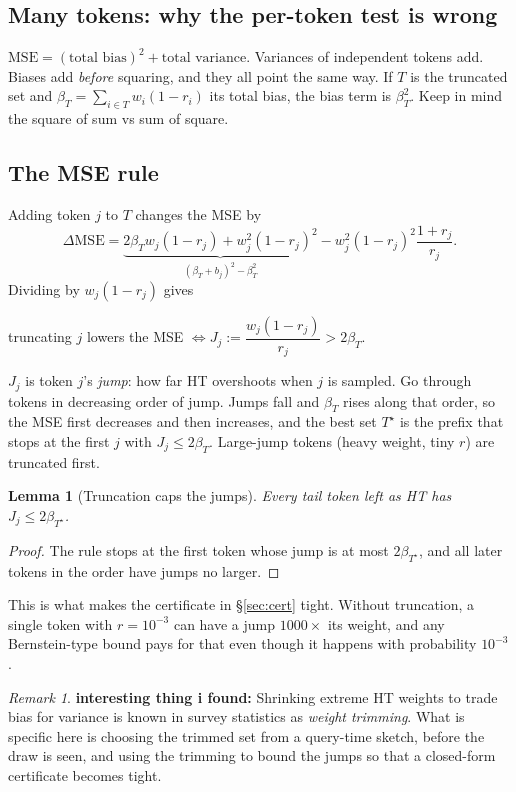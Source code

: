 \documentclass[11pt]{article}
\newtheorem{lemma}{Lemma}
\theoremstyle{definition}
\theoremstyle{remark}
\newtheorem{remark}{Remark}
\begin{document}
\subsection{Many tokens: why the per-token test is wrong}

$\mathrm{MSE} = (\text{total bias})^2 + \text{total variance}$. Variances of independent tokens add. Biases add
\emph{before} squaring, and they all point the same way. If $T$ is the truncated set and $\beta_T = \sum_{i \in T}
w_i(1 - r_i)$ its total bias, the bias term is $\beta_T^2$. Keep in mind the square of sum vs sum of square.

\subsection{The MSE rule}

Adding token $j$ to $T$ changes the MSE by
\[ \Delta\mathrm{MSE} = \underbrace{2\beta_T w_j(1 - r_j) + w_j^2(1 - r_j)^2}_{(\beta_T + b_j)^2 - \beta_T^2}
 - w_j^2 (1 - r_j)^2 \frac{1 + r_j}{r_j}. \]
Dividing by $w_j(1 - r_j)$ gives
\begin{tcolorbox}[colback=green!3,colframe=green!40!black,boxrule=0.4pt,arc=2pt]
\centering truncating $j$ lowers the MSE $\iff J_j := \dfrac{w_j(1 - r_j)}{r_j} > 2\beta_T$.
\end{tcolorbox}
$J_j$ is token $j$'s \emph{jump}: how far HT overshoots when $j$ is sampled. Go through tokens in decreasing order of jump.
Jumps fall and $\beta_T$ rises along that order, so the MSE first decreases and then increases, and the best set $T^\star$
is the prefix that stops at the first $j$ with $J_j \le 2\beta_T$. Large-jump tokens (heavy weight, tiny $r$) are truncated
first.

\begin{lemma}[Truncation caps the jumps]\label{lem:cap}
Every tail token left as HT has $J_j \le 2\beta_{T^\star}$.
\end{lemma}
\begin{proof}
The rule stops at the first token whose jump is at most $2\beta_{T^\star}$, and all later tokens in the order have jumps no
larger.
\end{proof}

This is what makes the certificate in \S\ref{sec:cert} tight. Without truncation, a single token with $r = 10^{-3}$ can have a
jump $1000\times$ its weight, and any Bernstein-type bound pays for that even though it happens with probability $10^{-3}$.

\begin{remark}
\textbf{interesting thing i found:} Shrinking extreme HT weights to trade bias for variance is known in survey statistics as
\emph{weight trimming}. What is specific here is choosing the trimmed set from a query-time sketch, before the draw is seen,
and using the trimming to bound the jumps so that a closed-form certificate becomes tight.
\end{remark}
\end{document}

